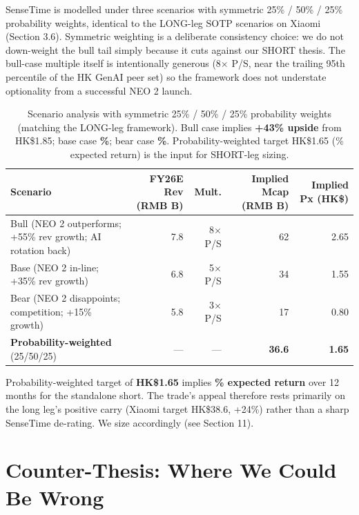 \documentclass[11pt,a4paper]{article}
\begin{document}
SenseTime is modelled under three scenarios with symmetric 25\% / 50\% / 25\% probability weights, identical to the LONG-leg SOTP scenarios on Xiaomi (Section 3.6). Symmetric weighting is a deliberate consistency choice: we do not down-weight the bull tail simply because it cuts against our SHORT thesis. The bull-case multiple itself is intentionally generous (8$\times$ P/S, near the trailing 95th percentile of the HK GenAI peer set) so the framework does not understate optionality from a successful NEO 2 launch.

\begin{table}[h]
\centering
\small
\begin{tabular}{lrrrr}
\toprule
\textbf{Scenario} & \textbf{FY26E Rev (RMB B)} & \textbf{Mult.} & \textbf{Implied Mcap (RMB B)} & \textbf{Implied Px (HK\$)} \\
\midrule
Bull (NEO 2 outperforms; +55\% rev growth; AI rotation back) & 7.8 & 8$\times$ P/S & 62 & 2.65 \\
\rowcolor{rowgray} Base (NEO 2 in-line; +35\% rev growth) & 6.8 & 5$\times$ P/S & 34 & 1.55 \\
Bear (NEO 2 disappoints; competition; +15\% growth) & 5.8 & 3$\times$ P/S & 17 & 0.80 \\
\midrule
\textbf{Probability-weighted} (25/50/25) & --- & --- & \textbf{36.6} & \textbf{1.65} \\
\bottomrule
\end{tabular}
\caption{Scenario analysis with symmetric 25\% / 50\% / 25\% probability weights (matching the LONG-leg framework). Bull case implies \textbf{+43\% upside} from HK\$1.85; base case \textbf{\%}; bear case \textbf{\%}. Probability-weighted target HK\$1.65 (\% expected return) is the input for SHORT-leg sizing.}
\end{table}

\begin{keyfindingbox}
Probability-weighted target of \textbf{HK\$1.65} implies \textbf{\% expected return} over 12 months for the standalone short. The trade's appeal therefore rests primarily on the long leg's positive carry (Xiaomi target HK\$38.6, +24\%) rather than a sharp SenseTime de-rating. We size accordingly (see Section 11).
\end{keyfindingbox}

\newpage
\section{Counter-Thesis: Where We Could Be Wrong}
\end{document}

